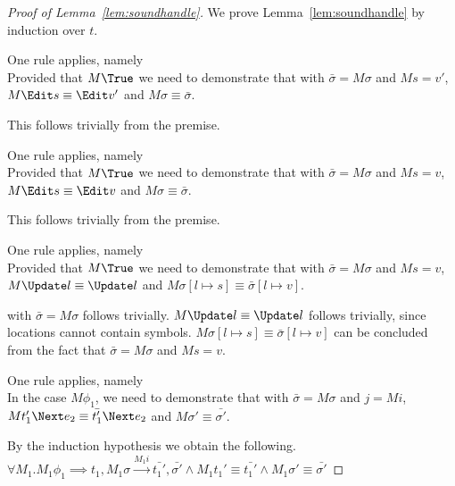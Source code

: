 \begin{proof}[Proof of Lemma~\ref{lem:soundhandle}]
  We prove Lemma~\ref{lem:soundhandle} by induction over $t$.\\

    {One rule applies, namely \\
    Provided that $M\True$ we need to demonstrate that  with $\bar{\sigma}=M\sigma$ and $M s = v'$,
    $M \Edit s\equiv \Edit v'$ and $ M\sigma\equiv \bar{\sigma}$.

    This follows trivially from the premise.

    }

  {One rule applies, namely \\
  Provided that $M\True$ we need to demonstrate that  with $\bar{\sigma}=M\sigma$ and $M s = v$,
  $M \Edit s \equiv \Edit v$ and $ M\sigma\equiv \bar{\sigma}$.

  This follows trivially from the premise.

  }

  {One rule applies, namely \\
  Provided that $M\True$
  we need to demonstrate that   with $\bar{\sigma}=M\sigma$ and $M s = v$,
  $M \Update l \equiv \Update l$ and $ M\sigma[l\mapsto s]\equiv \bar{\sigma}[l\mapsto v]$.

   with $\bar{\sigma}=M\sigma$ follows trivially.
  $M \Update l \equiv \Update l$ follows trivially, since locations cannot contain symbols. $ M\sigma[l\mapsto s]\equiv \bar{\sigma}[l\mapsto v]$ can be concluded from the fact that $\bar{\sigma}=M\sigma$ and $M s = v$.

  }

  {One rule applies, namely \\

  In the case $M\phi_1$, we need to demonstrate that  with $\bar{\sigma}=M\sigma$ and $j= M i$,
  $M t_1' \Next e_2 \equiv \bar{t_1'}\Next e_2$ and $M\sigma'\equiv\bar{\sigma'}$.

  By the induction hypothesis we obtain the following.\\
  $\forall M_1 . M_1 \phi_1 \implies t_1,M_1\sigma \xrightarrow[]{M_1 i} \bar{t_1'},\bar{\sigma'}\land M_1 t_1'\equiv\bar{t_1'}\land M_1\sigma' \equiv \bar{\sigma'}$

}
\end{proof}
